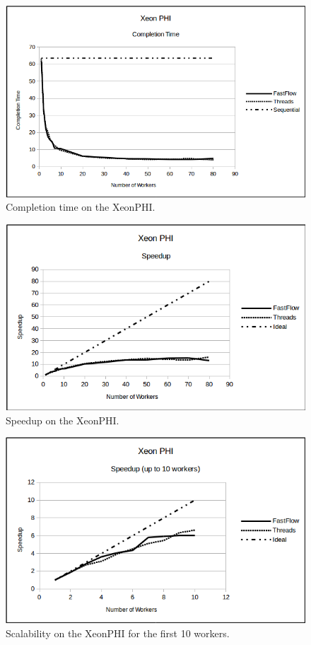 \documentclass[10pt]{article}
\numberwithin{equation}{section}
\begin{document}
\begin{figure} 
	\centering
	\includegraphics[scale=.75]{XeonPHI_CompletionTime.png}
	\caption{Completion time on the XeonPHI.}
	\label{fig:xeonphicompletiontime}
\end{figure}

\begin{figure} 
	\centering
	\includegraphics[scale=.75]{XeonPHI_Speedup.png}
	\caption{Speedup on the XeonPHI.}
	\label{fig:xeonphispeedup}
\end{figure}

\begin{figure} 
\centering
\includegraphics[scale=.75]{XeonPHI_Speedup10.png}
\caption{Scalability on the XeonPHI for the first 10 workers.}
\label{fig:xeonphispeedup10}
\end{figure}
\end{document}
